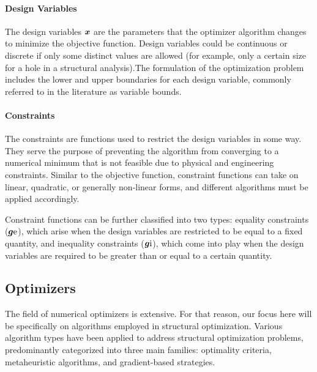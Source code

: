 \paragraph{Design Variables}
The design variables $\bm{x}$ are the parameters that the optimizer algorithm changes to minimize the objective function. Design variables could be continuous or discrete if only some distinct values are allowed (for example, only a certain size for a hole in a structural analysis).The formulation of the optimization problem includes the lower and upper boundaries for each design variable, commonly referred to in the literature as variable bounds.

\paragraph{Constraints}
The constraints are functions used to restrict the design variables in some way. They serve the purpose of preventing the algorithm from converging to a numerical minimum that is not feasible due to physical and engineering constraints. Similar to the objective function, constraint functions can take on linear, quadratic, or generally non-linear forms, and different algorithms must be applied accordingly.

Constraint functions can be further classified into two types: equality constraints ($\bm{g}\text{e}$), which arise when the design variables are restricted to be equal to a fixed quantity, and inequality constraints ($\bm{g}\text{i}$), which come into play when the design variables are required to be greater than or equal to a certain quantity.

\subsection{Optimizers}
The field of numerical optimizers is extensive. For that reason, our focus here will be specifically on algorithms employed in structural optimization. Various algorithm types have been applied to address structural optimization problems, predominantly categorized into three main families: optimality criteria, metaheuristic algorithms, and gradient-based strategies.

